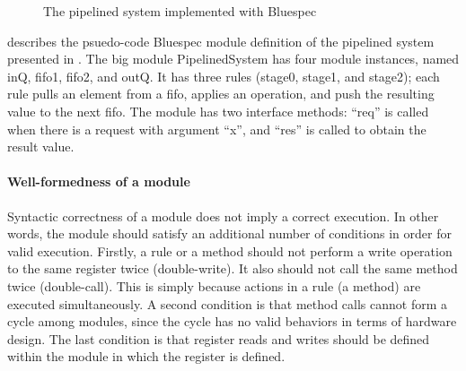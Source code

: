 \begin{figure}[t]
  \caption{The pipelined system implemented with Bluespec}
  \label{ex-pipelined-system-bluespec}
\end{figure}

 describes the psuedo-code
Bluespec module definition of the pipelined system presented in
. The big module PipelinedSystem has four
module instances, named inQ, fifo1, fifo2, and outQ. It has three
rules (stage0, stage1, and stage2); each rule pulls an element from a
fifo, applies an operation, and push the resulting value to the next
fifo. The module has two interface methods: ``req'' is called when
there is a request with argument ``x'', and ``res'' is called to
obtain the result value.

\paragraph{Well-formedness of a module}

Syntactic correctness of a module does not imply a correct
execution. In other words, the module should satisfy an additional
number of conditions in order for valid execution. Firstly, a rule or
a method should not perform a write operation to the same register
twice (double-write). It also should not call the same method twice
(double-call). This is simply because actions in a rule (a method) are
executed simultaneously. A second condition is that method calls
cannot form a cycle among modules, since the cycle has no valid
behaviors in terms of hardware design. The last condition is that
register reads and writes should be defined within the module in which
the register is defined.

